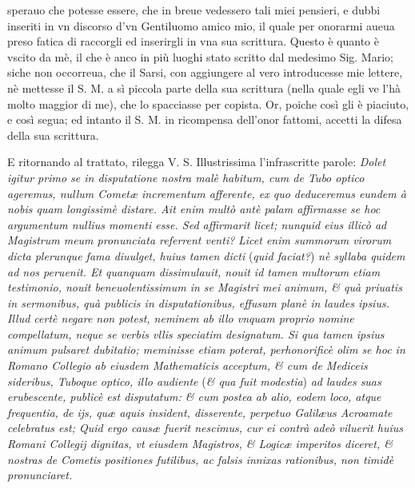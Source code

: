 \documentclass[11pt,twoside,openany]{book}
\begin{document}
sperauo che potesse essere, che in breue vedessero tali miei pensieri, e dubbi inseriti in vn discorso d'vn Gentiluomo amico mio, il quale per onorarmi aueua preso fatica di raccorgli ed inserirgli in vna sua scrittura. Questo è quanto è vscito da mè, il che è anco in più luoghi stato scritto dal medesimo Sig. Mario; siche non occorreua, che il Sarsi, con aggiungere al vero introducesse mie lettere, nè mettesse il S. M. a sì piccola parte della sua scrittura (nella quale egli ve l'hà molto maggior di me), che lo spacciasse per copista. Or, poiche così gli è piaciuto, e così segua; ed intanto il S. M. in ricompensa dell'onor fattomi, accetti la difesa della sua scrittura.



\par\bigskip\noindent{}\enspace E ritornando al trattato, rilegga V. S. Illustrissima l'infrascritte parole: \textit{Dolet igitur primo se in disputatione nostra malè habitum, cum de Tubo optico ageremus, nullum Cometæ incrementum afferente, ex quo deduceremus eundem à nobis quam longissimè distare. Ait enim multò antè palam affirmasse se hoc argumentum nullius momenti esse. Sed affirmarit licet; nunquid eius illicò ad Magistrum meum pronunciata referrent venti? }\textit{Licet enim summorum virorum dicta plerunque fama diuulget, huius tamen dicti }(\textit{quid faciat?})\textit{ nè syllaba quidem ad nos peruenit. Et quanquam dissimulauit, nouit id tamen multorum etiam testimonio, nouit beneuolentissimum in se Magistri mei animum, \& quà priuatis in sermonibus, quà publicis in disputationibus, effusum planè in laudes ipsius. }\textit{Illud certè negare non potest, neminem ab illo vnquam proprio nomine compellatum, neque se verbis vllis speciatim designatum. Si qua tamen ipsius animum pulsaret dubitatio; meminisse etiam poterat, perhonorificè olim se hoc in Romano Collegio ab eiusdem Mathematicis acceptum, \& cum de Mediceis sideribus, Tuboque optico, illo audiente }(\textit{\& qua fuit modestia})\textit{ ad laudes suas erubescente, publicè est disputatum: \& cum postea ab alio, eodem loco, atque frequentia, de ijs, quæ aquis insident, disserente, perpetuo Galilæus Acroamate celebratus est; Quid ergo causæ fuerit nescimus, cur ei contrà adeò viluerit huius Romani Collegij dignitas, vt eiusdem Magistros, \& Logicæ imperitos dice}\textit{ret, \& nostras de Cometis positiones futilibus, ac falsis innixas rationibus, non timidè pronunciaret.}
\end{document}

